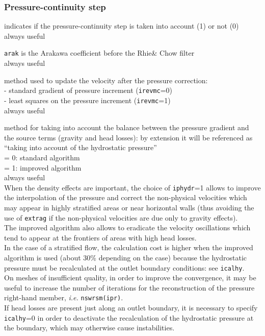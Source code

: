 \subsubsection{Pressure-continuity step}


{indicates if the pressure-continuity step is taken into account (1) or
not (0)\\
always useful}

{{\tt arak} is the Arakawa coefficient before the
Rhie\& Chow filter\\
always useful}

{method used to update the velocity after the pressure
correction:\\
\hspace*{0,5cm}- standard gradient of pressure increment
({\tt irevmc}=0)\\
\hspace*{0,5cm}- least squares on the pressure increment
({\tt irevmc}=1)\\
always useful}

{method for taking into account the balance between the pressure gradient and
the source terms (gravity and head losses): by extension it will be
referenced as ``taking into account of the hydrostatic pressure''\\
\hspace*{1.3cm}= 0: standard algorithm\\
\hspace*{1.3cm}= 1: improved algorithm\\
always useful\\
When the density effects are important, the choice of
{\tt iphydr}=1 allows to improve the interpolation of the pressure and correct the
non-physical velocities which may appear in highly
stratified areas or near horizontal walls (thus
avoiding the use of {\tt extrag} if the non-physical velocities are due only to
gravity effects).\\
The improved algorithm also allows to eradicate the velocity oscillations
which tend to appear at the frontiers of areas with high head losses.\\
In the case of a stratified flow, the calculation cost is higher when the
improved algorithm is used (about 30\% depending on the case) because
the hydrostatic pressure must be recalculated at the outlet boundary
conditions: see {\tt icalhy}.\\
On meshes of insufficient quality, in order to
improve the convergence, it may be useful to increase the number of
iterations for the reconstruction of the pressure right-hand member,
{\em i.e.} \mbox{\tt nswrsm(ipr)}.\\
If head losses are present just along an outlet boundary, it is necessary to
specify {\tt icalhy}=0 in order to deactivate the recalculation of the hydrostatic
pressure at the boundary, which may otherwise cause instabilities.}

